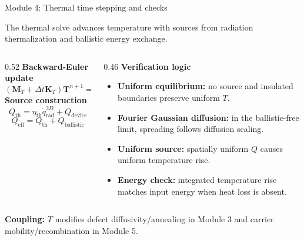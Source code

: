 \documentclass[aspectratio=169,9pt]{beamer}
\newcommand{\vect}[1]{\bm{#1}}
\newcommand{\mat}[1]{\mathbf{#1}}
\begin{document}
\begin{frame}{Module 4: Thermal time stepping and checks}
\footnotesize
\vspace{-3mm}
\begin{bluebox}
\centering
The thermal solve advances temperature with sources from radiation thermalization and ballistic energy exchange.
\end{bluebox}

\vspace{1mm}
\begin{columns}[T,totalwidth=\textwidth]
\begin{column}{0.52\textwidth}
\textbf{Backward-Euler update}
\begin{equation*}
\boxed{\left(\mat{M}_T+\Delta t\mat{K}_T\right)\vect{T}^{n+1}
=\mat{M}_T\vect{T}^{n}+\Delta t\,\vect{f}_T^{n+1}}
\end{equation*}
\textbf{Source construction}
\begin{equation*}
\boxed{Q_{\mathrm{th}}=\eta_{\mathrm{th}}\dot{q}_{\mathrm{rad}}^{2D}+Q_{\mathrm{device}}}
\end{equation*}
\begin{equation*}
\boxed{Q_{\mathrm{eff}}=Q_{\mathrm{th}}+Q_{\mathrm{ballistic}}}
\end{equation*}
\end{column}
\begin{column}{0.46\textwidth}
\textbf{Verification logic}
\begin{itemize}\setlength\itemsep{0.45mm}
\item \textbf{Uniform equilibrium:} no source and insulated boundaries preserve uniform \(T\).
\item \textbf{Fourier Gaussian diffusion:} in the ballistic-free limit, spreading follows diffusion scaling.
\item \textbf{Uniform source:} spatially uniform \(Q\) causes uniform temperature rise.
\item \textbf{Energy check:} integrated temperature rise matches input energy when heat loss is absent.
\end{itemize}
\end{column}
\end{columns}

\vspace{1mm}
\begin{orangebox}
\centering\scriptsize
\textbf{Coupling:} \(T\) modifies defect diffusivity/annealing in Module 3 and carrier mobility/recombination in Module 5.
\end{orangebox}
\end{frame}
\end{document}

